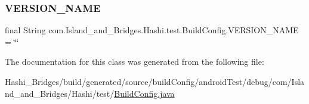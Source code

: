 \subsubsection{\texorpdfstring{V\+E\+R\+S\+I\+O\+N\+\_\+\+N\+A\+ME}{VERSION\_NAME}}
{\footnotesize\ttfamily final String com.\+Island\+\_\+and\+\_\+\+Bridges.\+Hashi.\+test.\+Build\+Config.\+V\+E\+R\+S\+I\+O\+N\+\_\+\+N\+A\+ME = \char`\"{}\char`\"{}\hspace{0.3cm}{\ttfamily [static]}}



The documentation for this class was generated from the following file\+:\begin{DoxyCompactItemize}
\item 
Hashi\+\_\+\+Bridges/build/generated/source/build\+Config/android\+Test/debug/com/\+Island\+\_\+and\+\_\+\+Bridges/\+Hashi/test/\mbox{\hyperlink{android_test_2debug_2com_2_island__and___bridges_2_hashi_2test_2_build_config_8java}{Build\+Config.\+java}}\end{DoxyCompactItemize}
